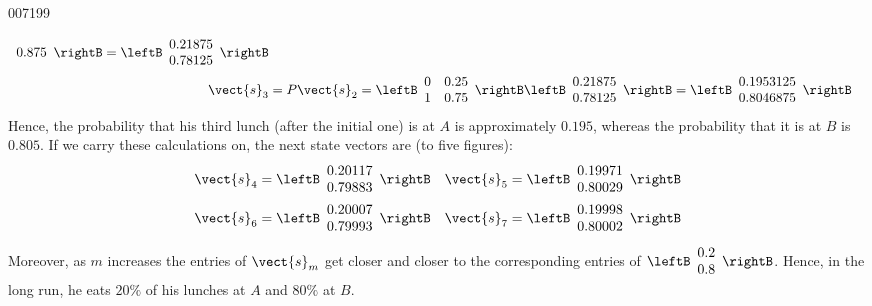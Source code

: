\begin{example}{}{007199}
\begin{solution}
\begin{align*}
\begin{array}{r}
0.875
\end{array} \rightB = \leftB \begin{array}{r}
0.21875 \\
0.78125
\end{array} \rightB \\
\vect{s}_{3} &= P\vect{s}_2 = \leftB \begin{array}{rr}
0 & 0.25 \\
1 & 0.75
\end{array} \rightB \leftB \begin{array}{r}
0.21875 \\
0.78125
\end{array} \rightB = \leftB \begin{array}{r}
0.1953125 \\
0.8046875
\end{array} \rightB
\end{align*}
Hence, the probability that his third lunch (after the initial one) is at $A$ is approximately $0.195$, whereas the probability that it is at $B$ is $0.805$. If we carry these calculations on, the next state vectors are (to five figures):
\begin{align*}
\vect{s}_4 &= \leftB \begin{array}{r}
0.20117 \\
0.79883
\end{array} \rightB \quad \vect{s}_5 = \leftB \begin{array}{r}
0.19971 \\
0.80029
\end{array} \rightB \\
\vect{s}_6 &= \leftB \begin{array}{r}
0.20007 \\
0.79993
\end{array} \rightB \quad \vect{s}_7 = \leftB \begin{array}{r}
0.19998 \\
0.80002
\end{array} \rightB
\end{align*}
Moreover, as $m$ increases the entries of $\vect{s}_{m}$ get closer and closer to the corresponding entries of $\leftB \begin{array}{c}
0.2 \\
0.8
\end{array} \rightB$.
 Hence, in the long run, he eats $20\%$ of his lunches at $A$ and $80\%$ at $B$.
\end{solution}
\end{example}


